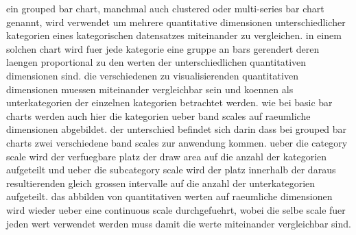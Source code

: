 ein grouped bar chart, manchmal auch clustered oder multi-series bar chart genannt, wird verwendet um mehrere quantitative dimensionen unterschiedlicher kategorien eines kategorischen datensatzes miteinander zu vergleichen.
in einem solchen chart wird fuer jede kategorie eine gruppe an bars gerendert deren laengen proportional zu den werten der unterschiedlichen quantitativen dimensionen sind.
die verschiedenen zu visualisierenden quantitativen dimensionen muessen miteinander vergleichbar sein und koennen als unterkategorien der einzelnen kategorien betrachtet werden.
wie bei basic bar charts werden auch hier die kategorien ueber band scales auf raeumliche dimensionen abgebildet.
der unterschied befindet sich darin dass bei grouped bar charts zwei verschiedene band scales zur anwendung kommen.
ueber die category scale wird der verfuegbare platz der draw area auf die anzahl der kategorien aufgeteilt und ueber die subcategory scale wird der platz innerhalb der daraus resultierenden gleich grossen intervalle auf die anzahl der unterkategorien aufgeteilt.
das abbilden von quantitativen werten auf raeumliche dimensionen wird wieder ueber eine continuous scale durchgefuehrt, wobei die selbe scale fuer jeden wert verwendet werden muss damit die werte miteinander vergleichbar sind.

